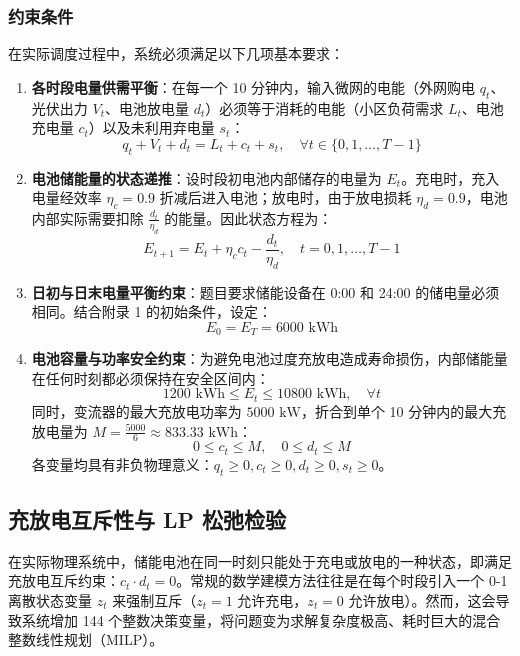 \documentclass[withoutpreface]{cumcmthesis}
\begin{document}
\subsubsection{约束条件}
在实际调度过程中，系统必须满足以下几项基本要求：
\begin{enumerate}
    \item \textbf{各时段电量供需平衡}：在每一个 10 分钟内，输入微网的电能（外网购电 $q_t$、光伏出力 $V_t$、电池放电量 $d_t$）必须等于消耗的电能（小区负荷需求 $L_t$、电池充电量 $c_t$）以及未利用弃电量 $s_t$：
    \begin{equation}
        q_t + V_t + d_t = L_t + c_t + s_t, \quad \forall t \in \{0, 1, \dots, T-1\} \label{eq:q1_balance}
    \end{equation}
    
    \item \textbf{电池储能量的状态递推}：设时段初电池内部储存的电量为 $E_t$。充电时，充入电量经效率 $\eta_c = 0.9$ 折减后进入电池；放电时，由于放电损耗 $\eta_d = 0.9$，电池内部实际需要扣除 $\frac{d_t}{\eta_d}$ 的能量。因此状态方程为：
    \begin{equation}
        E_{t+1} = E_t + \eta_c c_t - \frac{d_t}{\eta_d}, \quad t = 0, 1, \dots, T-1 \label{eq:q1_soc}
    \end{equation}
    
    \item \textbf{日初与日末电量平衡约束}：题目要求储能设备在 0:00 和 24:00 的储电量必须相同。结合附录 1 的初始条件，设定：
    \begin{equation}
        E_0 = E_T = 6000\text{ kWh}
    \end{equation}
    
    \item \textbf{电池容量与功率安全约束}：为避免电池过度充放电造成寿命损伤，内部储能量在任何时刻都必须保持在安全区间内：
    \begin{equation}
        1200\text{ kWh} \le E_t \le 10800\text{ kWh}, \quad \forall t
    \end{equation}
    同时，变流器的最大充放电功率为 $5000\text{ kW}$，折合到单个 10 分钟内的最大充放电量为 $M = \frac{5000}{6} \approx 833.33\text{ kWh}$：
    \begin{equation}
        0 \le c_t \le M, \quad 0 \le d_t \le M
    \end{equation}
    各变量均具有非负物理意义：$q_t \ge 0, c_t \ge 0, d_t \ge 0, s_t \ge 0$。
\end{enumerate}

\subsection{充放电互斥性与 LP 松弛检验}
在实际物理系统中，储能电池在同一时刻只能处于充电或放电的一种状态，即满足充放电互斥约束：$c_t \cdot d_t = 0$。常规的数学建模方法往往是在每个时段引入一个 0-1 离散状态变量 $z_t$ 来强制互斥（$z_t=1$ 允许充电，$z_t=0$ 允许放电）。然而，这会导致系统增加 144 个整数决策变量，将问题变为求解复杂度极高、耗时巨大的混合整数线性规划（MILP）。
\end{document}
